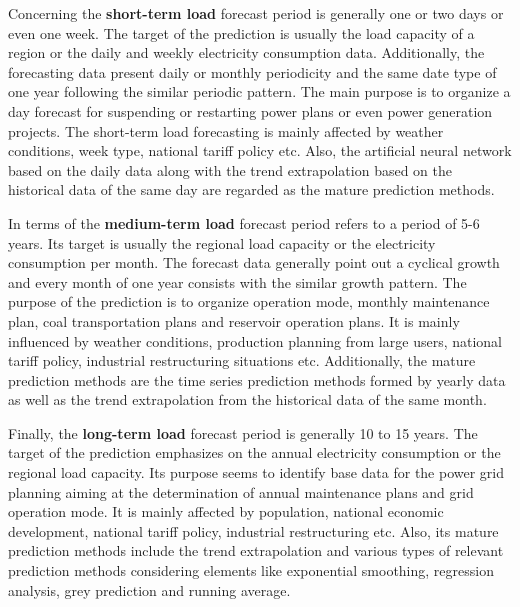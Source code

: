 \par Concerning the \textbf{short-term load} forecast period is generally one or two days or even one week. The target of the prediction is usually the load capacity of a region or the daily and weekly electricity consumption data. Additionally, the forecasting data present daily or monthly periodicity and the same date type of one year following the similar periodic pattern. The main purpose is to organize a day forecast for suspending or restarting power plans or even power generation projects. The short-term load forecasting is mainly affected by weather conditions, week type, national tariff policy etc. Also, the artificial neural network based on the daily data along with the trend extrapolation based on the historical data of the same day are regarded as the mature prediction methods.
\par In terms of the \textbf{medium-term load} forecast period refers to a period of 5-6 years. Its target is usually the regional load capacity or the electricity consumption per month. The forecast data generally point out a cyclical growth and every month of one year consists with the similar growth pattern. The purpose of the prediction is to organize operation mode, monthly maintenance plan, coal transportation plans and reservoir operation plans. It is mainly influenced by weather conditions, production planning from large users, national tariff policy, industrial restructuring situations etc. Additionally, the mature prediction methods are the time series prediction methods formed by yearly data as well as the trend  extrapolation from the historical data of the same month.
\par Finally, the \textbf{long-term load} forecast period is generally 10 to 15 years. The target of the prediction emphasizes on the annual electricity consumption or the regional load capacity. Its purpose seems to identify base data for the power grid planning aiming at the determination of annual maintenance plans and grid operation mode. It is mainly affected by population, national economic development, national tariff policy, industrial restructuring etc. Also, its mature prediction methods include the trend extrapolation and various types of relevant prediction methods considering elements like exponential smoothing, regression analysis, grey prediction and running average.

